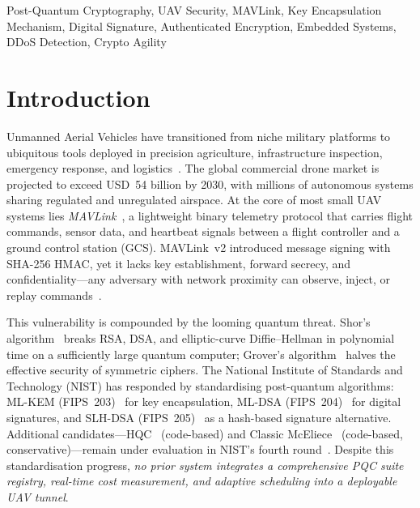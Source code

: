 \documentclass[conference]{IEEEtran}
\newcommand{\mlkem}{\textsf{ML-KEM}}
\newcommand{\mldsa}{\textsf{ML-DSA}}
\newcommand{\slhdsa}{\textsf{SLH-DSA}}
\begin{document}
\begin{IEEEkeywords}
Post-Quantum Cryptography, UAV Security, MAVLink, Key Encapsulation Mechanism, Digital Signature, Authenticated Encryption, Embedded Systems, DDoS Detection, Crypto Agility
\end{IEEEkeywords}

\section{Introduction}
\label{sec:intro}

Unmanned Aerial Vehicles have transitioned from niche military platforms to ubiquitous tools deployed in precision agriculture, infrastructure inspection, emergency response, and logistics~\cite{drone-security-survey}.
The global commercial drone market is projected to exceed USD~54 billion by 2030, with millions of autonomous systems sharing regulated and unregulated airspace.
At the core of most small UAV systems lies \emph{MAVLink}~\cite{mavlink-spec}, a lightweight binary telemetry protocol that carries flight commands, sensor data, and heartbeat signals between a flight controller and a ground control station (GCS).
MAVLink~v2 introduced message signing with SHA-256 HMAC, yet it lacks key establishment, forward secrecy, and confidentiality---any adversary with network proximity can observe, inject, or replay commands~\cite{drone-pqc-analysis}.

This vulnerability is compounded by the looming quantum threat.
Shor's algorithm~\cite{shor1994} breaks RSA, DSA, and elliptic-curve Diffie--Hellman in polynomial time on a sufficiently large quantum computer; Grover's algorithm~\cite{grover1996} halves the effective security of symmetric ciphers.
The National Institute of Standards and Technology (NIST) has responded by standardising post-quantum algorithms: \mlkem{} (FIPS~203)~\cite{nist-fips203} for key encapsulation, \mldsa{} (FIPS~204)~\cite{nist-fips204} for digital signatures, and \slhdsa{} (FIPS~205)~\cite{nist-fips205} as a hash-based signature alternative.
Additional candidates---HQC~\cite{hqc} (code-based) and Classic McEliece~\cite{mceliece} (code-based, conservative)---remain under evaluation in NIST's fourth round~\cite{nist-round4}.
Despite this standardisation progress, \emph{no prior system integrates a comprehensive PQC suite registry, real-time cost measurement, and adaptive scheduling into a deployable UAV tunnel}.
\end{document}
